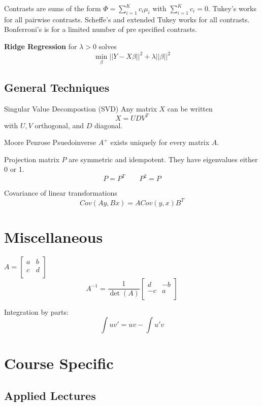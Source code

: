 \documentclass[10pt, twocolumn]{article}
\begin{document}
Contrasts are sums of the form $\Phi = \sum_{i=1}^K c_i \mu_i$ with
$\sum_{i=1}^K c_i = 0$.
Tukey's works for all pairwise contrasts.
Scheffe's and extended Tukey works for all contrasts.
Bonferroni's is for a limited number of pre specified contrasts.

\textbf{Ridge Regression} for $\lambda > 0$ solves
\[
    \min_\beta ||Y - X\beta||^2 + \lambda ||\beta||^2
\]

\subsection{General Techniques}

Singular Value Decompostion (SVD) Any matrix $X$ can be written
\[
    X = UDV^T
\]
with $U, V$ orthogonal, and $D$ diagonal.

Moore Penrose Psuedoinverse $A^+$ exists uniquely for every matrix $A$.

Projection matrix $P$ are symmetric and idempotent. They have eigenvalues
either 0 or 1.
\[
    P = P^T \qquad P^2 = P
\]

Covariance of linear transformations
\[
    Cov(Ay, Bx) = A Cov(y, x) B^T
\]


\newpage

\section{Miscellaneous}

$
    A = 
    [\begin{smallmatrix}
        a & b \\
        c & d \\
    \end{smallmatrix}]
$
\[
    A^{-1} = 
    \frac{1}{\det (A)}
    \begin{bmatrix}
        d & -b \\
        -c & a \\
    \end{bmatrix}
\]

Integration by parts:
\[
    \int uv' = uv - \int u'v
\]

\section{Course Specific}

\subsection{Applied Lectures}
\end{document}
